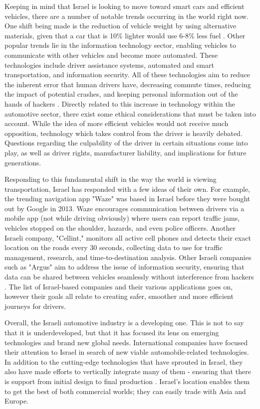 \documentclass{report}                         %
\begin{document}
Keeping in mind that Israel is looking to move toward smart cars and efficient vehicles, there are a number of notable trends occurring in the world right now. One shift being made is the reduction of vehicle weight by using alternative materials, given that a car that is 10\% lighter would use 6-8\% less fuel \cite{MinistryofEconomyandIndustryStateofIsraelTheIsrael}. Other popular trends lie in the information technology sector, enabling vehicles to communicate with other vehicles and become more automated. These technologies include driver assistance systems, automated and smart transportation, and information security. All of these technologies aim to reduce the inherent error that human drivers have, decreasing commute times, reducing the impact of potential crashes, and keeping personal information out of the hands of hackers \cite{MinistryofEconomyandIndustryStateofIsraelTheIsrael}. Directly related to this increase in technology within the automotive sector, there exist some ethical considerations that must be taken into account. While the idea of more efficient vehicles would not receive much opposition, technology which takes control from the driver is heavily debated. Questions regarding the culpability of the driver in certain situations come into play, as well as driver rights, manufacturer liability, and implications for future generations.

Responding to this fundamental shift in the way the world is viewing transportation, Israel has responded with a few ideas of their own. For example, the trending navigation app "Waze" was based in Israel before they were bought out by Google in 2013. Waze encourages communication between drivers via a mobile app (not while driving obviously) where users can report traffic jams, vehicles stopped on the shoulder, hazards, and even police officers. Another Israeli company, "Cellint," monitors all active cell phones and detects their exact location on the roads every 30 seconds, collecting data to use for traffic management, research, and time-to-destination analysis. Other Israeli companies such as "Argus" aim to address the issue of information security, ensuring that data can be shared between vehicles seamlessly without interference from hackers \cite{MinistryofEconomyandIndustryStateofIsraelTheIsrael}. The list of Israel-based companies and their various applications goes on, however their goals all relate to creating safer, smoother and more efficient journeys for drivers.

Overall, the Israeli automotive industry is a developing one. This is not to say that it is underdeveloped, but that it has focused its lens on emerging technologies and brand new global needs. International companies have focused their attention to Israel in search of new viable automobile-related technologies. In addition to the cutting-edge technologies that have sprouted in Israel, they also have made efforts to vertically integrate many of them - ensuring that there is support from initial design to final production \cite{MinistryofEconomyandIndustryStateofIsraelTheIsrael}. Israel's location enables them to get the best of both commercial worlds; they can easily trade with Asia and Europe.
\end{document}
